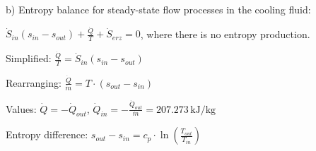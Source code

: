 b) Entropy balance for steady-state flow processes in the cooling fluid:  

\( \dot{S}_{in} (s_{in} - s_{out}) + \frac{\dot{Q}}{T} + \dot{S}_{erz} = 0 \), where there is no entropy production.  

Simplified:  
\( \frac{\dot{Q}}{T} = \dot{S}_{in} (s_{in} - s_{out}) \)  

Rearranging:  
\( \frac{\dot{Q}}{\dot{m}} = T \cdot (s_{out} - s_{in}) \)  

Values:  
\( \dot{Q} = -\dot{Q}_{out} \), \( \dot{Q}_{in} = -\frac{\dot{Q}_{out}}{\dot{m}} = 207.273 \, \text{kJ/kg} \)  

Entropy difference:  
\( s_{out} - s_{in} = c_{p} \cdot \ln \left( \frac{T_{out}}{T_{in}} \right) \)